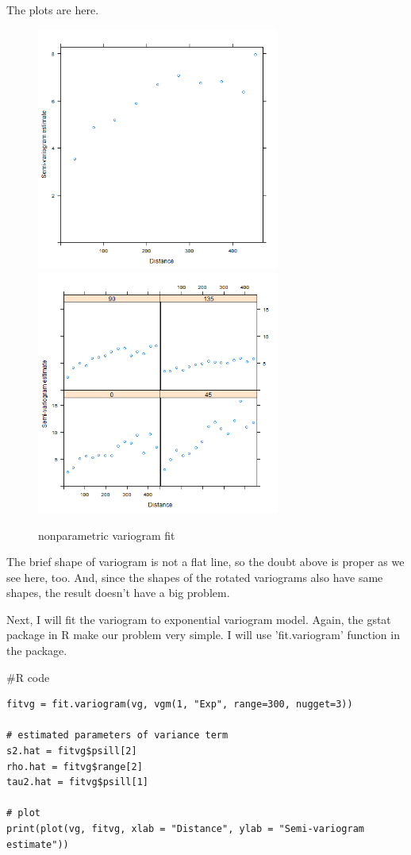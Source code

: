 \documentclass{article}
\newenvironment{Rcode}%
{%
    \begin{mdframed}
    \#R code
    \begin{small}
}
{%
    \end{small}
    \end{mdframed}
}
\begin{document}
The plots are here. 
\begin{figure}[!h]
    \centering
    \includegraphics[height=8cm]{prob2_CAtemp_variogram.png}
    \includegraphics[height=8cm]{prob2_CAtemp_variogram_angle.png}
    \caption{nonparametric variogram fit}
\end{figure}

The brief shape of variogram is not a flat line, so the doubt above is proper as we see here, too.
And, since the shapes of the rotated variograms also have same shapes, the result doesn't have a big problem.

Next, I will fit the variogram to exponential variogram model.
Again, the gstat package in R make our problem very simple. I will use 'fit.variogram' function in the package.

\begin{Rcode}
    \begin{verbatim}
fitvg = fit.variogram(vg, vgm(1, "Exp", range=300, nugget=3)) 

# estimated parameters of variance term
s2.hat = fitvg$psill[2]
rho.hat = fitvg$range[2]
tau2.hat = fitvg$psill[1]

# plot
print(plot(vg, fitvg, xlab = "Distance", ylab = "Semi-variogram estimate"))
    \end{verbatim}
\end{Rcode}
\end{document}
